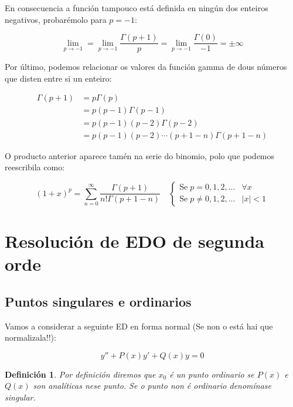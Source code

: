 \documentclass[a4paper,12pt,titlepage]{article}
\newtheorem{mydef}{Definición}
\begin{document}
En consecuencia a función tampouco está definida en ningún dos enteiros negativos, probarémolo para $p=-1$:

\begin{equation*}
    \lim_{p\to-1} = \lim_{p\to-1} \frac{\Gamma(p+1)}{p} = \lim_{p\to-1} \frac{\Gamma(0)}{-1} = \pm \infty
\end{equation*}

Por último, podemos relacionar os valores da función gamma de dous números que disten entre si un enteiro:


\begin{align*}
    \Gamma(p+1)&=p\Gamma(p)\\ &= p(p-1)\Gamma(p-1)\\ &= p(p-1)(p-2)\Gamma(p-2) \\ &= p(p-1)(p-2) \cdots (p+1-n)\Gamma(p+1-n)
\end{align*}

O producto anterior aparece tamén na serie do binomio, polo que podemos reescribila como:

\begin{equation*}
    (1+x)^p = \sum_{n=0}^{\infty} \frac{\Gamma(p+1)}{n!\Gamma(p+1-n)} \quad \left\{ \begin{array}{lc}
        \text{Se} \; p=0,1,2,... & \forall x \\
        \text{Se} \; p \neq 0,1,2,... & |x|<1
    \end{array} \right.
\end{equation*}

\newpage

\section{Resolución de EDO de segunda orde}

\subsection{Puntos singulares e ordinarios}

Vamos a considerar a seguinte ED en forma normal (Se non o está hai que normalizala!!):

\begin{equation*}
    y'' +P(x)y' + Q(x)y =0
\end{equation*}

\begin{mydef}
Por definición diremos que $x_0$ é un punto ordinario se $P(x)$ e $Q(x)$ son analíticas nese punto. Se o punto non é ordinario denomínase singular.
\end{mydef}
\end{document}
